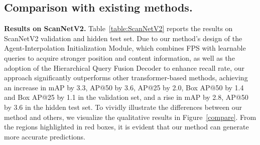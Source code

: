 \subsection{Comparison with existing methods.}
\textbf{Results on ScanNetV2.}
Table~\ref{table:ScanNetV2} reports the results on ScanNetV2 validation and hidden test set.
Due to our method's design of the Agent-Interpolation Initialization Module, which combines FPS with learnable queries to acquire stronger position and content information, as well as the adoption of the Hierarchical Query Fusion Decoder to enhance recall rate, our approach significantly outperforms other transformer-based methods, achieving an increase in mAP by 3.3, AP@50 by 3.6, AP@25 by 2.0, Box AP@50 by 1.4 and Box AP@25 by 1.1 in the validation set, and a rise in mAP by 2.8, AP@50 by 3.6 in the hidden test set. To vividly illustrate the differences between our method and others, we visualize the qualitative results in Figure~\ref{compare}. From the regions highlighted in red boxes, it is evident that our method can generate more accurate predictions.

